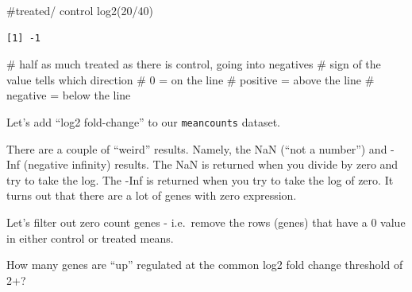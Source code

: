 \documentclass[
  letterpaper,
  DIV=11,
  numbers=noendperiod]{scrartcl}
\newenvironment{Shaded}{\begin{snugshade}}{\end{snugshade}}
\newcommand{\AttributeTok}[1]{\textcolor[rgb]{0.40,0.45,0.13}{#1}}
\newcommand{\CommentTok}[1]{\textcolor[rgb]{0.37,0.37,0.37}{#1}}
\newcommand{\DecValTok}[1]{\textcolor[rgb]{0.68,0.00,0.00}{#1}}
\newcommand{\FunctionTok}[1]{\textcolor[rgb]{0.28,0.35,0.67}{#1}}
\newcommand{\NormalTok}[1]{\textcolor[rgb]{0.00,0.23,0.31}{#1}}
\newcommand{\OtherTok}[1]{\textcolor[rgb]{0.00,0.23,0.31}{#1}}
\newcommand{\SpecialCharTok}[1]{\textcolor[rgb]{0.37,0.37,0.37}{#1}}
\begin{document}
\begin{Shaded}
\begin{Highlighting}[]
\CommentTok{\#treated/ control}
\FunctionTok{log2}\NormalTok{(}\DecValTok{20}\SpecialCharTok{/}\DecValTok{40}\NormalTok{)}
\end{Highlighting}
\end{Shaded}

\begin{verbatim}
[1] -1
\end{verbatim}

\begin{Shaded}
\begin{Highlighting}[]
\CommentTok{\# half as much treated as there is control, going into negatives}
\CommentTok{\# sign of the value tells which direction }
\CommentTok{\# 0 = on the line }
\CommentTok{\# positive = above the line }
\CommentTok{\# negative = below the line }
\end{Highlighting}
\end{Shaded}

Let's add ``log2 fold-change'' to our \texttt{meancounts} dataset.

\begin{Shaded}
\end{Shaded}

There are a couple of ``weird'' results. Namely, the NaN (``not a
number'') and -Inf (negative infinity) results. The NaN is returned when
you divide by zero and try to take the log. The -Inf is returned when
you try to take the log of zero. It turns out that there are a lot of
genes with zero expression.

Let's filter out zero count genes - i.e.~remove the rows (genes) that
have a 0 value in either control or treated means.

How many genes are ``up'' regulated at the common log2 fold change
threshold of 2+?

\begin{Shaded}
\end{Shaded}
\end{document}

